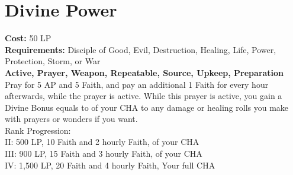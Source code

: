 \section{Divine Power}\label{prayer:divinePower}
\textbf{Cost:} 50 LP\\
\textbf{Requirements:} Disciple of Good, Evil, Destruction, Healing, Life, Power, Protection, Storm, or War\\
\textbf{Active, Prayer, Weapon, Repeatable, Source, Upkeep, Preparation}\\
Pray for 5 AP and 5 Faith, and pay an additional 1 Faith for every hour afterwards, while the prayer is active.
While this prayer is active, you gain a Divine Bonus equals to  of your CHA to any damage or healing rolls you make with prayers or wonders if you want.
\\
Rank Progression:\\
II: 500 LP, 10 Faith and 2 hourly Faith,  of your CHA\\
III: 900 LP, 15 Faith and 3 hourly Faith,  of your CHA\\
IV: 1,500 LP, 20 Faith and 4 hourly Faith, Your full CHA\\